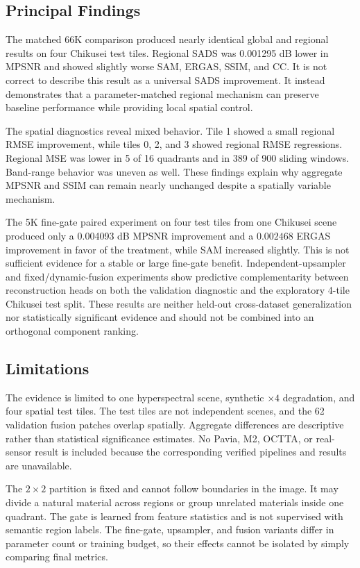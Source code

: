 \documentclass[10pt,twocolumn,letterpaper]{article}
\begin{document}
\subsection{Principal Findings}

The matched 66K comparison produced nearly identical global and regional results on four Chikusei test tiles. Regional SADS was 0.001295 dB lower in MPSNR and showed slightly worse SAM, ERGAS, SSIM, and CC. It is not correct to describe this result as a universal SADS improvement. It instead demonstrates that a parameter-matched regional mechanism can preserve baseline performance while providing local spatial control.

The spatial diagnostics reveal mixed behavior. Tile 1 showed a small regional RMSE improvement, while tiles 0, 2, and 3 showed regional RMSE regressions. Regional MSE was lower in 5 of 16 quadrants and in 389 of 900 sliding windows. Band-range behavior was uneven as well. These findings explain why aggregate MPSNR and SSIM can remain nearly unchanged despite a spatially variable mechanism.

The 5K fine-gate paired experiment on four test tiles from one Chikusei scene produced only a 0.004093 dB MPSNR improvement and a $0.002468$ ERGAS improvement in favor of the treatment, while SAM increased slightly. This is not sufficient evidence for a stable or large fine-gate benefit. Independent-upsampler and fixed/dynamic-fusion experiments show predictive complementarity between reconstruction heads on both the validation diagnostic and the exploratory 4-tile Chikusei test split. These results are neither held-out cross-dataset generalization nor statistically significant evidence and should not be combined into an orthogonal component ranking.

\subsection{Limitations}

The evidence is limited to one hyperspectral scene, synthetic $\times4$ degradation, and four spatial test tiles. The test tiles are not independent scenes, and the 62 validation fusion patches overlap spatially. Aggregate differences are descriptive rather than statistical significance estimates. No Pavia, M2, OCTTA, or real-sensor result is included because the corresponding verified pipelines and results are unavailable.

The $2\times2$ partition is fixed and cannot follow boundaries in the image. It may divide a natural material across regions or group unrelated materials inside one quadrant. The gate is learned from feature statistics and is not supervised with semantic region labels. The fine-gate, upsampler, and fusion variants differ in parameter count or training budget, so their effects cannot be isolated by simply comparing final metrics.
\end{document}
